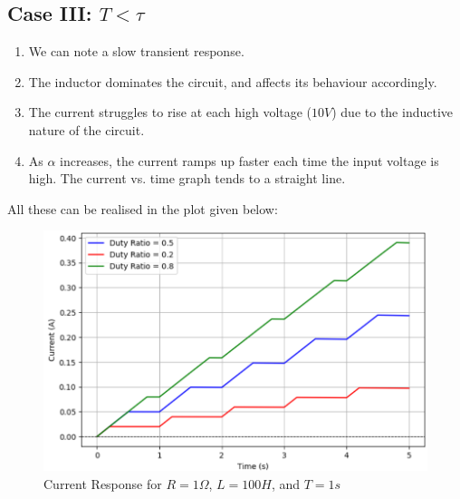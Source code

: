 \begin{multicols}{2}
\subsection{Case III: $T<\tau$}
\begin{enumerate}
    \item We can note a slow transient response.
    \item The inductor dominates the circuit, and affects its behaviour accordingly.
    \item The current struggles to rise at each high voltage ($10V$) due to the inductive nature of the circuit.
    \item As $\alpha$ increases, the current ramps up faster each time the input voltage is high. The current vs. time graph tends to a straight line.
\end{enumerate}
All these can be realised in the plot given below: \\
\begin{figure}[H]
  \centering
  \includegraphics[width=\columnwidth]{sections/6_case3.png}
  \caption{Current Response for $R=1\Omega$, $L=100H$, and $T=1s$}
\end{figure}
\end{multicols}



